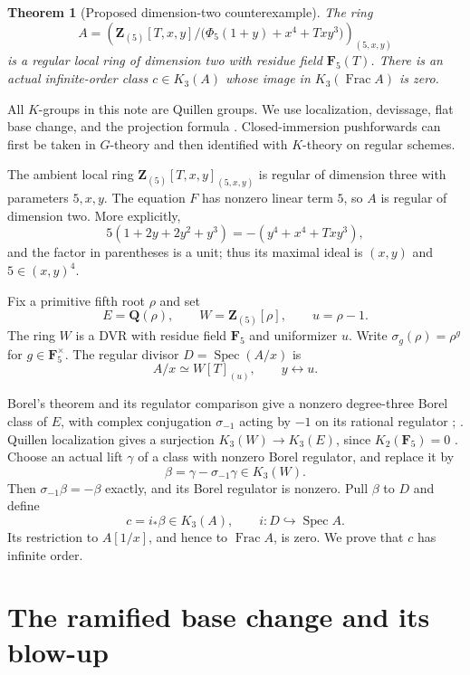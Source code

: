 \documentclass[11pt,a4paper]{article}
\newtheorem{theorem}{Theorem}[section]
\theoremstyle{remark}
\newcommand{\Z}{\mathbf Z}
\newcommand{\Q}{\mathbf Q}
\newcommand{\F}{\mathbf F}
\newcommand{\Spec}{\operatorname{Spec}}
\newcommand{\Frac}{\operatorname{Frac}}
\begin{document}
\begin{theorem}[Proposed dimension-two counterexample]
\label{thm:twodimgeometric}
The ring
\[
 A=\left(\Z_{(5)}[T,x,y]/
       \bigl(\Phi_5(1+y)+x^4+Txy^3\bigr)\right)_{(5,x,y)}
\]
is a regular local ring of dimension two with residue field $\F_5(T)$.
There is an actual infinite-order class $c\in K_3(A)$ whose image in
$K_3(\Frac A)$ is zero.
\end{theorem}

All $K$-groups in this note are Quillen groups. We use localization,
devissage, flat base change, and the projection formula
\cite{Quillen}. Closed-immersion pushforwards can first be taken in
$G$-theory and then identified with $K$-theory on regular schemes.

The ambient local ring
$\Z_{(5)}[T,x,y]_{(5,x,y)}$ is regular of dimension three with parameters
$5,x,y$. The equation $F$ has nonzero linear term $5$, so $A$ is
regular of dimension two. More explicitly,
\[
 5(1+2y+2y^2+y^3)=-(y^4+x^4+Txy^3),
\]
and the factor in parentheses is a unit; thus its maximal ideal is
$(x,y)$ and $5\in(x,y)^4$.

Fix a primitive fifth root $\rho$ and set
\[
 E=\Q(\rho),\qquad W=\Z_{(5)}[\rho],\qquad u=\rho-1.
\]
The ring $W$ is a DVR with residue field $\F_5$ and uniformizer $u$.
Write $\sigma_g(\rho)=\rho^g$ for $g\in\F_5^\times$.
The regular divisor $D=\Spec(A/x)$ is
\[
 A/x\simeq W[T]_{(u)},\qquad y\longleftrightarrow u.
\]

Borel's theorem and its regulator comparison give a nonzero
degree-three Borel class of $E$, with complex conjugation
$\sigma_{-1}$ acting by $-1$ on its rational regulator
\cite[Proposition~12.2]{Borel};
\cite[Section~6, especially (6.4)]{BunkeTamme}.
Quillen localization gives a surjection $K_3(W)\to K_3(E)$, since
$K_2(\F_5)=0$ \cite{QuillenFinite}. Choose an actual lift $\gamma$ of
a class with nonzero Borel regulator, and replace it by
\[
 \beta=\gamma-\sigma_{-1}\gamma\in K_3(W).
\]
Then $\sigma_{-1}\beta=-\beta$ exactly, and its Borel regulator is
nonzero. Pull $\beta$ to $D$ and define
\begin{equation}\label{eq:twodimsupported}
 c=i_*\beta\in K_3(A),\qquad i:D\hookrightarrow\Spec A.
\end{equation}
Its restriction to $A[1/x]$, and hence to $\Frac A$, is zero.
We prove that $c$ has infinite order.

\section{The ramified base change and its blow-up}
\end{document}
